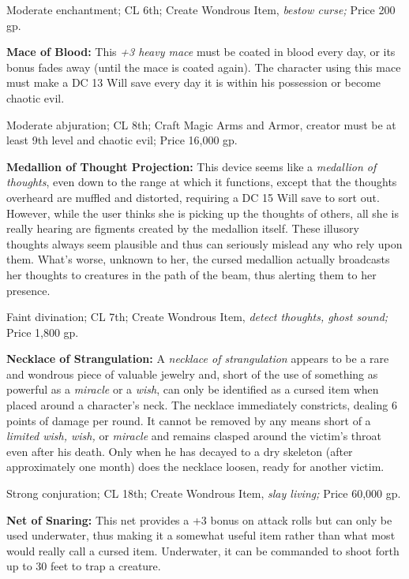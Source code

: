Moderate enchantment; CL 6th; Create Wondrous Item, \textit{bestow curse; }Price 
200 gp.

\textbf{Mace of Blood:} This \textit{+3 heavy mace }must be coated in blood every 
day, or its bonus fades away (until the mace is coated again). The character using 
this mace must make a DC 13 Will save every day it is within his possession or 
become chaotic evil.

Moderate abjuration; CL 8th; Craft Magic Arms and Armor, creator must be at least 
9th level and chaotic evil; Price 16,000 gp.

\textbf{Medallion of Thought Projection:} This device seems like a \textit{medallion 
of thoughts}, even down to the range at which it functions, except that the thoughts 
overheard are muffled and distorted, requiring a DC 15 Will save to sort out. However, 
while the user thinks she is picking up the thoughts of others, all she is really 
hearing are figments created by the medallion itself. These illusory thoughts always 
seem plausible and thus can seriously mislead any who rely upon them. What's worse, 
unknown to her, the cursed medallion actually broadcasts her thoughts to creatures 
in the path of the beam, thus alerting them to her presence.

Faint divination; CL 7th; Create Wondrous Item, \textit{detect thoughts, ghost 
sound; }Price 1,800 gp.

\textbf{Necklace of Strangulation:} A \textit{necklace of strangulation }appears 
to be a rare and wondrous piece of valuable jewelry and, short of the use of something 
as powerful as a \textit{miracle }or a \textit{wish}, can only be identified as 
a cursed item when placed around a character's neck. The necklace immediately constricts, 
dealing 6 points of damage per round. It cannot be removed by any means short of 
a \textit{limited wish, wish, }or \textit{miracle }and remains clasped around the 
victim's throat even after his death. Only when he has decayed to a dry skeleton 
(after approximately one month) does the necklace loosen, ready for another victim.

Strong conjuration; CL 18th; Create Wondrous Item, \textit{slay living; }Price 
60,000 gp.

\textbf{Net of Snaring: }This net provides a +3 bonus on attack rolls but can only 
be used underwater, thus making it a somewhat useful item rather than what most 
would really call a cursed item. Underwater, it can be commanded to shoot forth 
up to 30 feet to trap a creature.

